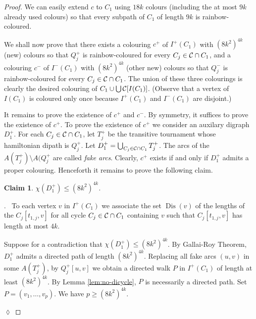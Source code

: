 \documentclass[utf8,10pt]{article}
\theoremstyle{plain}
\newtheorem{claim}{Claim}[theorem]
\theoremstyle{definition}
\theoremstyle{remark}
\newenvironment{subproof}{\par\noindent {\it Subproof}.\ }{\hfill$\lozenge$\par\vspace{11pt}}
\newcommand{\col}{(8k^2)^{4k}}
\DeclareMathOperator{\Dis}{Dis}
\begin{document}
\begin{proof}
We can easily extend $c$ to $C_1$ using $18k$ colours (including the at most $9k$ already used colours)
so that every subpath of $C_1$ of length $9k$ is rainbow-coloured.

We shall now prove that there exists a colouring $c^+$ of $I^+(C_1)$ with $\col$ (new) colours so that $Q^+_j$ is rainbow-coloured for every $C_j\in {\cal C}\cap C_1$, and a colouring $c^-$ of $I^-(C_1)$ with $\col$ (other new) colours so that $Q^-_j$ is rainbow-coloured for every $C_j\in {\cal C}\cap C_1$.
The union of these three colourings is clearly the desired colouring of $C_1\cup \bigcup{\cal C}[I(C_1)]$. (Observe that a vertex of $I(C_1)$ is coloured only once because  $I^+(C_1)$ and $I^-(C_1)$ are disjoint.)

It remains to prove the existence of $c^+$ and $c^-$. By symmetry, it suffices to prove the existence of $c^+$.
 To prove the existence of $c^+$ we consider an auxilary digraph $D^+_1$.
 For each $C_j\in {\cal C}\cap C_1$, let $T^+_j$ be the transitive tournament whose hamiltonian dipath is $Q^+_j$.
Let $D^+_1=\bigcup_{C_j\in  {\cal C}\cap C_1} T^+_j$. 
The arcs of the $A(T^+_j)\setminus A(Q^+_j$ are called {\it fake arcs}.
Clearly, $c^+$ exists if and only if $D^+_1$ admits a proper colouring. Henceforth it remains to prove the following claim.

\begin{claim}
$\chi(D^+_1) \leq  \col$.
\end{claim}

\begin{subproof}
To each vertex $v$ in $I^+(C_1)$ we associate the set $\Dis(v)$ of the lengths of the $C_j[t_{1,j},v]$ for all cycle $C_j\in {\cal C} \cap C_1$ containing $v$ such that $C_j[t_{1,j},v]$ has length at most $4k$.


Suppose for a contradiction that $\chi(D^+_1) \leq  \col$.
By Gallai-Roy Theorem, $D^+_1$ admits a directed path of length $\col$. Replacing all fake arcs  $(u,v)$ in some $A(T^+_j)$, by 
$Q^+_j[u,v]$ we obtain a directed walk $P$ in $I^+(C_1)$ of length at least $\col$. By Lemma \ref{lem:no-dicycle}, $P$ is necessarily a directed path. Set $P=(v_1,  \dots , v_{p})$. We have $p\geq \col$.


\end{subproof}
\end{proof}
\end{document}
